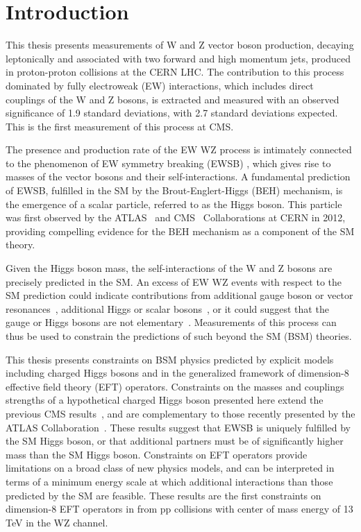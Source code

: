 \chapter{Introduction}

This thesis presents measurements of W and Z vector boson production, 
decaying leptonically and associated
with two forward and high momentum jets, produced in proton-proton collisions
at the CERN LHC. The contribution to this process dominated by fully electroweak (EW)
interactions, which includes direct couplings of the W and Z bosons, 
is extracted and measured with an observed significance of
1.9 standard deviations, with 2.7 standard deviations expected. 
This is the first measurement of this process at CMS. 

The presence and production rate of the EW WZ process is intimately connected to the 
phenomenon of EW symmetry breaking (EWSB) \cite{Quigg:2009vq}, which gives rise to masses of
the vector bosons and their self-interactions. A fundamental prediction
of EWSB, fulfilled in the SM by the Brout-Englert-Higgs (BEH) mechanism,
is the emergence of a scalar particle, referred 
to as the Higgs boson. 
This particle was first observed by the 
ATLAS~\cite{Aad:2012tfa} and CMS~\cite{Chatrchyan:2012xdj,Chatrchyan:2013lba} Collaborations
at CERN in 2012, providing compelling evidence for the BEH mechanism as
a component of the SM theory.

Given the Higgs boson mass, the self-interactions 
of the W and Z bosons are precisely predicted in the SM. 
An excess of EW WZ events with respect to the SM prediction could indicate contributions from 
additional gauge boson or vector resonances~\cite{Delgado:2017cls}, 
additional Higgs or scalar bosons~\cite{Kilian:2015opv}, 
or it could suggest that the gauge or Higgs bosons are not elementary~\cite{Csaki:2015hcd}.
Measurements of this process can thus be used to constrain the predictions
of such beyond the SM (BSM) theories. 

This thesis presents constraints on BSM physics predicted by explicit models
including charged Higgs bosons 
and in the generalized framework of dimension-8 effective field theory (EFT) operators.
Constraints on the masses and couplings strengths of a hypothetical
charged Higgs boson presented here extend the previous CMS results~\cite{Sirunyan:2017sbn}, and
are complementary to those recently presented by the ATLAS Collaboration~\cite{Aaboud:2018ohp}. 
These results suggest that EWSB is uniquely fulfilled by the SM Higgs boson,
or that additional partners must be of significantly higher mass than the
SM Higgs boson.
Constraints on EFT operators provide limitations on a broad class of new physics
models, and can be interpreted in terms of a minimum energy scale at which additional
interactions than those predicted by the SM are feasible.
These results are the first constraints on dimension-8 EFT operators 
in from pp collisions with center of mass energy of 13 TeV in the WZ channel.

